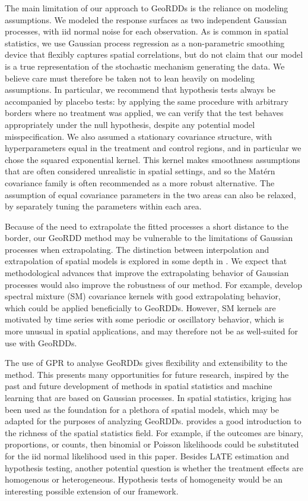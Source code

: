 The main limitation of our approach to GeoRDDs is the reliance on modeling assumptions.
We modeled the response surfaces as two independent Gaussian processes, with iid normal noise for each observation.
As is common in spatial statistics, we use Gaussian process regression as a non-parametric smoothing device that flexibly captures spatial correlations, but do not claim that our model is a true representation of the stochastic mechanism generating the data.
We believe care must therefore be taken not to lean heavily on modeling assumptions.
In particular, we recommend that hypothesis tests always be accompanied by placebo tests:
by applying the same procedure with arbitrary borders where no treatment was applied, we can verify that the test behaves appropriately under the null hypothesis, despite any potential model misspecification.
We also assumed a stationary covariance structure, with hyperparameters equal in the treatment and control regions, and in particular we chose the squared exponential kernel.
This kernel makes smoothness assumptions that are often considered unrealistic in spatial settings, and so the Mat\'ern covariance family is often recommended as a more robust alternative.
The assumption of equal covariance parameters in the two areas can also be relaxed, by separately tuning the parameters within each area.

Because of the need to extrapolate the fitted processes a short distance to the border, our GeoRDD method may be vulnerable to the limitations of Gaussian processes when extrapolating.
The distinction between interpolation and extrapolation of spatial models is explored in some depth in \cite{stein2012interpolation}.
We expect that methodological advances that improve the extrapolating behavior of Gaussian processes would also improve the robustness of our method.
For example, \cite{wilson2013gaussian} develop spectral mixture (SM) covariance kernels with good extrapolating behavior, which could be applied beneficially to GeoRDDs.
However, SM kernels are motivated by time series with some periodic or oscillatory behavior, which is more unusual in spatial applications, and may therefore not be as well-suited for use with GeoRDDs.

The use of GPR to analyse GeoRDDs gives flexibility and extensibility to the method.
This presents many opportunities for future research, inspired by the past and future development of methods in spatial statistics and machine learning that are based on Gaussian processes.
In spatial statistics, kriging has been used as the foundation for a plethora of spatial models, which may be adapted for the purposes of analyzing GeoRDDs.
\cite{banerjee2014hierarchical} provides a good introduction to the richness of the spatial statistics field.
For example, if the outcomes are binary, proportions, or counts, then binomial or Poisson likelihoods could be substituted for the iid normal likelihood used in this paper.
Besides LATE estimation and hypothesis testing, another potential question is whether the treatment effects are homogenous or heterogeneous.
Hypothesis tests of homogeneity would be an interesting possible extension of our framework.

